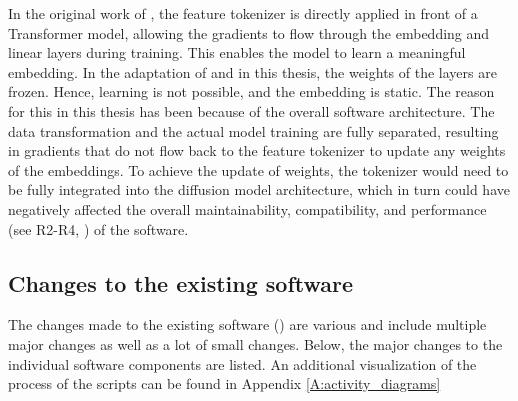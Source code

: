 In the original work of \cite{gorishniy2021RevisitingDeepLearning}, the feature tokenizer is directly applied in front of a Transformer \gls{model}, allowing the gradients to flow through the embedding and linear layers during training.
This enables the \gls{model} to learn a meaningful embedding.
In the adaptation of \cite{zheng2023DiffusionModelsMissing} and in this thesis, the weights of the layers are frozen.
Hence, learning is not possible, and the embedding is static.
The reason for this in this thesis has been because of the overall software architecture.
The data transformation and the actual \gls{model} training are fully separated,
resulting in gradients that do not flow back to the feature tokenizer to update any weights of the embeddings.
To achieve the update of weights, the tokenizer would need to be fully integrated into the diffusion \gls{model} architecture, which in turn could have negatively affected the overall maintainability, compatibility, and performance (see R2-R4, ) of the software.

\subsection{Changes to the existing software}
\label{ch:methods-changes}
The changes made to the existing software () are various and include multiple major changes as well as a lot of small changes.
Below, the major changes to the individual software components are listed.
An additional visualization of the process of the scripts can be found in Appendix \ref{A:activity_diagrams}

